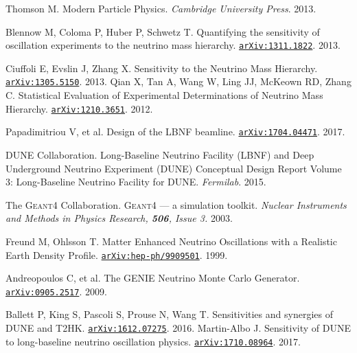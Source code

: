 \begin{thebibliography}{100}
	 Thomson M. Modern Particle Physics. \textit{Cambridge
		University Press}. 2013.


	 Blennow M, Coloma P, Huber P, Schwetz T. Quantifying the
		sensitivity of oscillation experiments to the neutrino mass hierarchy.
		\href{https://arxiv.org/pdf/1311.1822.pdf}{\texttt{arXiv:1311.1822}}. 2013.

	 Ciuffoli E, Evslin J, Zhang X. Sensitivity to the
		Neutrino Mass Hierarchy.
		\href{https://arxiv.org/abs/1305.5150v4}{\texttt{arXiv:1305.5150}}. 2013.
	 Qian X, Tan A, Wang W, Ling JJ, McKeown RD, Zhang C.
		Statistical Evaluation of Experimental Determinations of Neutrino Mass
		Hierarchy.
		\href{https://arxiv.org/abs/1210.3651}{\texttt{arXiv:1210.3651}}. 2012.





	 Papadimitriou V, et al. Design of the LBNF beamline.
		\href{https://arxiv.org/abs/1704.04471}{\texttt{arXiv:1704.04471}}. 2017.

	 DUNE Collaboration. Long-Baseline Neutrino Facility (LBNF)
		and Deep Underground Neutrino Experiment (DUNE) Conceptual Design Report
		Volume 3: Long-Baseline Neutrino Facility for DUNE. \textit{Fermilab}. 2015.





	 The \textsc{Geant4} Collaboration.
		\textsc{Geant4} --- a simulation toolkit. \textit{Nuclear Instruments and Methods in
		Physics Research, \textbf{506}, Issue 3.} 2003. 

	 Freund M, Ohlsson T. Matter Enhanced Neutrino Oscillations
		with a Realistic Earth Density Profile.
		\href{https://arxiv.org/abs/hep-ph/9909501}{\texttt{arXiv:hep-ph/9909501}}.
		1999.

	 Andreopoulos C, et al. The \textsc{GENIE} Neutrino Monte
		Carlo Generator.
		\href{https://arxiv.org/abs/0905.2517}{\texttt{arXiv:0905.2517}}. 2009.



	 Ballett P, King S, Pascoli S, Prouse N, Wang T.
		Sensitivities and synergies of DUNE and T2HK. \href{
		https://arxiv.org/pdf/1612.07275.pdf}{\texttt{arXiv:1612.07275}}. 2016.
	 Martin-Albo J. Sensitivity of DUNE to long-baseline
		neutrino oscillation physics.
		\href{https://arxiv.org/abs/1710.08964}{\texttt{arXiv:1710.08964}}. 2017.


\end{thebibliography}
